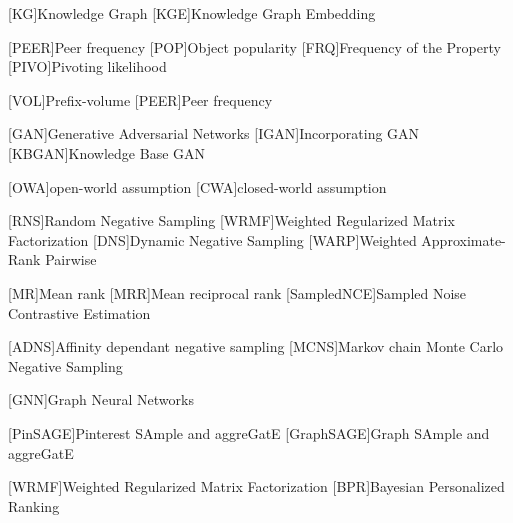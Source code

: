 \begin{acronym}[ECU]

[KG]{Knowledge Graph}
[KGE]{Knowledge Graph Embedding}

[PEER]{Peer frequency}
[POP]{Object popularity }
[FRQ]{Frequency of the Property}
[PIVO]{Pivoting likelihood}

[VOL]{Prefix-volume}
[PEER]{Peer frequency}

[GAN]{Generative Adversarial Networks}
[IGAN]{Incorporating GAN}
[KBGAN]{Knowledge Base GAN}


[OWA]{open-world assumption}
[CWA]{closed-world assumption}

[RNS]{Random Negative Sampling}
[WRMF]{Weighted Regularized Matrix Factorization}
[DNS]{Dynamic Negative Sampling}
[WARP]{Weighted Approximate-Rank Pairwise}

[MR]{Mean rank}
[MRR]{Mean reciprocal rank}
[SampledNCE]{Sampled Noise Contrastive Estimation}

[ADNS]{Affinity dependant negative sampling}
[MCNS]{Markov chain Monte Carlo Negative Sampling}
    
[GNN]{Graph Neural Networks}

[PinSAGE]{Pinterest SAmple and aggreGatE}
[GraphSAGE]{Graph SAmple and aggreGatE}


[WRMF]{Weighted Regularized Matrix Factorization}
[BPR]{Bayesian Personalized Ranking}




\end{acronym}